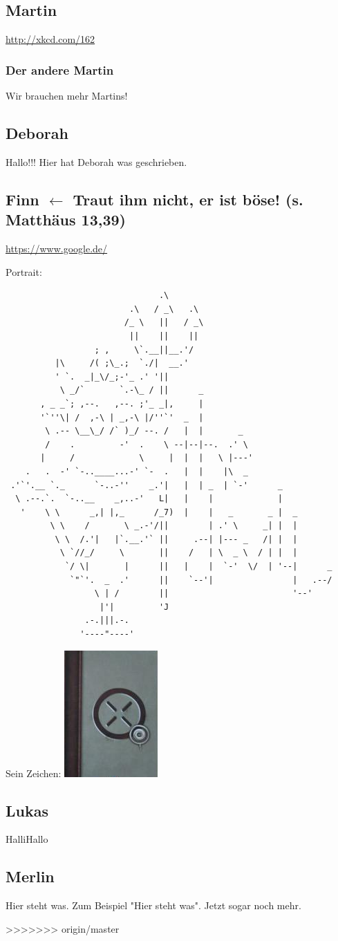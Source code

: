 \documentclass[12pt]{scrartcl}
\begin{document}
\subsection{Martin}
\url{http://xkcd.com/162}
\subsubsection{Der andere Martin}
Wir brauchen mehr Martins!

\subsection{Deborah}
Hallo!!! Hier hat Deborah was geschrieben.

\newpage
\subsection{Finn $\leftarrow$ Traut ihm nicht, er ist böse! (s. Matthäus 13,39)}
\url{https://www.google.de/}

Portrait:
\begin{verbatim}
                               .\
                         .\   / _\   .\
                        /_ \   ||   / _\
                         ||    ||    ||
                  ; ,     \`.__||__.'/
          |\     /( ;\_.;  `./|  __.'
          ' `.  _|_\/_;-'_ .' '||
           \ _/`       `.-\_ / ||      _
       , _ _`; ,--.   ,--. ;'_ _|,     |
       '`''\| /  ,-\ | _,-\ |/''`'  _  |
        \ .-- \__\_/ /` )_/ --. /   |  |       _
        /    .         -'  .    \ --|--|--.  .' \
       |     /             \     |  |  |   \ |---'
    .   .  -' `-..____...-' `-  .   |  |    |\  _
 .'`'.__ `._      `-..-''    _.'|   |  | _  | `-'      _
  \ .--.`.  `-..__    _,..-'   L|   |    |             |
   '    \ \      _,| |,_      /_7)  |    |   _       _ |  _
         \ \    /       \ _.-'/||        | .' \     _| |  |
          \ \  /.'|   |`.__.'` ||     .--| |--- _   /| |  |
           \ `//_/     \       ||    /   | \  _ \  / | |  |
            `/ \|       |      ||   |    |  `-'  \/  | '--|      _
             `"`'.  _  .'      ||    `--'|                |   .--/
                  \ | /        ||                         '--'
                   |'|         'J
                .-.|||.-.
               '----"----' 
\end{verbatim}

Sein Zeichen: \includegraphics{finnsZeichen.png}
\subsection{Lukas}
HalliHallo


\subsection{Merlin}
Hier steht was.
Zum Beispiel "Hier steht was".
Jetzt sogar noch mehr.

>>>>>>> origin/master
\end{document}

